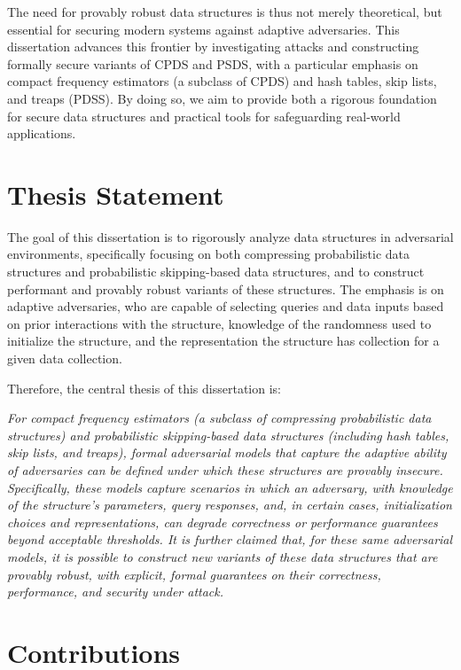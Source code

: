 The need for provably robust data structures is thus not merely theoretical, but essential for securing modern systems against adaptive adversaries. This dissertation advances this frontier by investigating attacks and constructing formally secure variants of CPDS and PSDS, with a particular emphasis on compact frequency estimators (a subclass of CPDS) and hash tables, skip lists, and treaps (PDSS). By doing so, we aim to provide both a rigorous foundation for secure data structures and practical tools for safeguarding real-world applications.

\section{Thesis Statement}

The goal of this dissertation is to rigorously analyze data structures in adversarial environments, specifically focusing on both compressing probabilistic data structures and probabilistic skipping-based data structures, and to construct performant and provably robust variants of these structures. The emphasis is on adaptive adversaries, who are capable of selecting queries and data inputs based on prior interactions with the structure, knowledge of the randomness used to initialize the structure, and the representation the structure has collection for a given data collection.

Therefore, the central thesis of this dissertation is:

\emph{For compact frequency estimators (a subclass of compressing probabilistic data structures) and probabilistic skipping-based data structures (including hash tables, skip lists, and treaps), formal adversarial models that capture the adaptive ability of adversaries can be defined under which these structures are provably insecure. Specifically, these models capture scenarios in which an adversary, with knowledge of the structure’s parameters, query responses, and, in certain cases, initialization choices and representations, can degrade correctness or performance guarantees beyond acceptable thresholds. It is further claimed that, for these same adversarial models, it is possible to construct new variants of these data structures that are provably robust, with explicit, formal guarantees on their correctness, performance, and security under attack.}

\section{Contributions}

